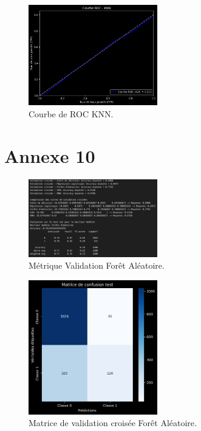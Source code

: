 \begin{figure}[H]
\centering
\includegraphics[width=0.5\textwidth]{figures/ROCKNN.png}
\caption{Courbe de ROC KNN.}
\end{figure}
\section*{Annexe 10}
\label{sec:annexe10}
\begin{figure}[H]
\centering
\includegraphics[width=0.5\textwidth]{figures/Annexe10.png}
\caption{Métrique Validation Forêt Aléatoire.}
\label{fig:annexe10}
\end{figure}

\begin{figure}[H]
\centering
\includegraphics[width=0.5\textwidth]{figures/MatriceVC1.png}
\caption{Matrice de validation croisée Forêt Aléatoire.}
\end{figure}


